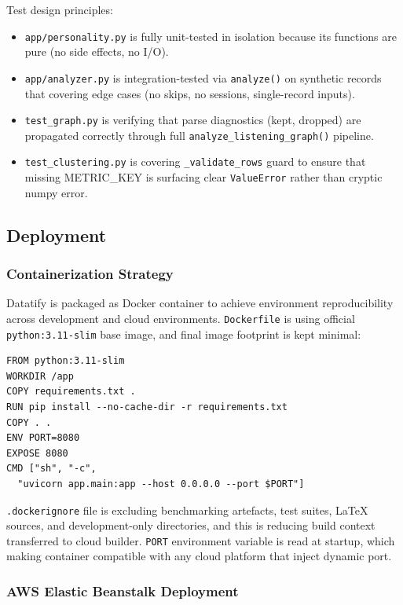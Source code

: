 \documentclass[conference]{IEEEtran}
\begin{document}
Test design principles:
\begin{itemize}
  \item \texttt{app/personality.py} is fully unit-tested in isolation because
        its functions are pure (no side effects, no I/O).
  \item \texttt{app/analyzer.py} is integration-tested via
        \texttt{analyze()} on synthetic records that covering edge cases
        (no skips, no sessions, single-record inputs).
  \item \texttt{test\_graph.py} is verifying that parse diagnostics (kept,
        dropped) are propagated correctly through full
        \texttt{analyze\_listening\_graph()} pipeline.
  \item \texttt{test\_clustering.py} is covering \texttt{\_validate\_rows}
        guard to ensure that missing METRIC\_KEY is surfacing clear
        \texttt{ValueError} rather than cryptic numpy error.
\end{itemize}

\subsection{Deployment}

\subsubsection{Containerization Strategy}

Datatify is packaged as Docker container to achieve environment reproducibility across development and cloud environments. \texttt{Dockerfile} is using official \texttt{python:3.11-slim} base image, and final image footprint is kept minimal:

\begin{verbatim}
FROM python:3.11-slim
WORKDIR /app
COPY requirements.txt .
RUN pip install --no-cache-dir -r requirements.txt
COPY . .
ENV PORT=8080
EXPOSE 8080
CMD ["sh", "-c",
  "uvicorn app.main:app --host 0.0.0.0 --port $PORT"]
\end{verbatim}

\texttt{.dockerignore} file is excluding benchmarking artefacts, test suites, LaTeX sources, and development-only directories, and this is reducing build context transferred to cloud builder. \texttt{PORT} environment variable is read at startup, which making container compatible with any cloud platform that inject dynamic port.

\subsubsection{AWS Elastic Beanstalk Deployment}
\end{document}
